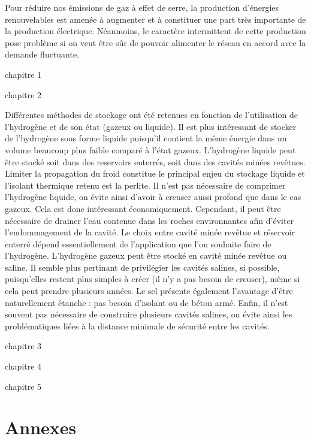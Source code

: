 \documentclass[11pt,french,a4paper]{article}
\makeatletter
\newcommand\backmatter{%
    \clearpage
   }
\makeatother
\begin{document}

Pour réduire nos émissions de gaz à effet de serre, la production d’énergies renouvelables est amenée à augmenter et à constituer une part très importante de la production électrique. Néanmoins, le caractère intermittent de cette production pose problème si on veut être sûr de pouvoir alimenter le réseau en accord avec la demande fluctuante. 

chapitre 1

chapitre 2

Différentes méthodes de stockage  ont été retenues en fonction de l'utilisation de l'hydrogène et de son état (gazeux ou liquide). 
Il est plus intéressant de stocker de l'hydrogène sous forme liquide puisqu'il contient la même énergie dans un volume beaucoup plus faible comparé à l'état gazeux. 
L'hydrogène liquide peut être stocké soit dans des reservoirs enterrés, soit dans des cavités minées revêtues. Limiter la propagation du froid constitue le principal enjeu du stockage liquide et l'isolant thermique retenu est la perlite. Il n'est pas nécessaire  de comprimer l'hydrogène liquide, on évite ainsi d'avoir à creuser aussi profond que dans le cas gazeux. Cela est donc intéressant économiquement. Cependant, il peut être nécessaire de drainer l'eau contenue dans les roches environnantes afin d'éviter l'endommagement de la cavité. Le choix entre cavité minée revêtue et réservoir enterré dépend essentiellement de l'application que l'on souhaite faire de l'hydrogène.
L'hydrogène gazeux peut être stocké en cavité minée revêtue ou saline. Il semble plus pertinant de privilégier les cavités salines, si possible, puisqu'elles restent plus simples à créer (il n'y a pas besoin de creuser), même si cela peut prendre plusieurs années. Le sel présente également l'avantage d'être naturellement étanche : pas besoin d'isolant ou de béton armé. Enfin, il n'est souvent pas nécessaire de construire plusieurs cavités salines, on évite ainsi les problématiques liées à la distance minimale de sécurité entre les cavités.

chapitre 3

chapitre 4

chapitre 5



\newpage

\backmatter

\section*{Annexes} 
\end{document}

